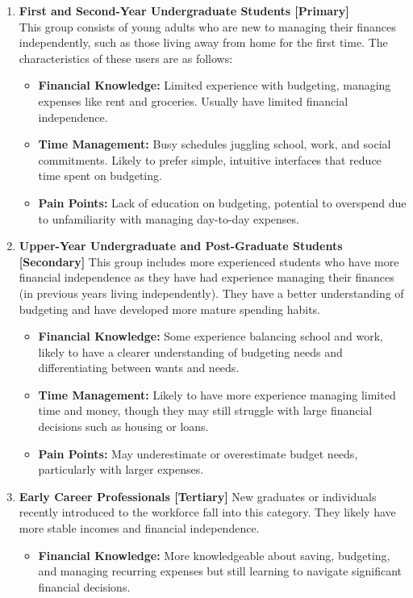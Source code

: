 \documentclass[12pt]{article}
\begin{document}
\begin{enumerate}
	\item \textbf{First and Second-Year Undergraduate Students [Primary]} \\ 
		This group consists of young adults who are new to managing their finances independently, such as those living away from home for the first time. The characteristics of these users are as follows:
		\begin{itemize}
			\item \textbf{Financial Knowledge:} Limited experience with budgeting, managing expenses like rent and groceries. Usually have limited financial independence.
			\item \textbf{Time Management:} Busy schedules juggling school, work, and social commitments. Likely to prefer simple, intuitive interfaces that reduce time spent on budgeting.
			\item \textbf{Pain Points:} Lack of education on budgeting, potential to overspend due to unfamiliarity with managing day-to-day expenses.
		\end{itemize}
	\item \textbf{Upper-Year Undergraduate and Post-Graduate Students [Secondary]}
		This group includes more experienced students who have more financial independence as they have had experience managing their finances (in previous years living independently).  They have a better understanding of budgeting and have developed more mature spending habits.
		\begin{itemize}
			\item \textbf{Financial Knowledge:}  Some experience balancing school and work, likely to have a clearer understanding of budgeting needs and differentiating between wants and needs.
			\item \textbf{Time Management:} Likely to have more experience managing limited time and money, though they may still struggle with large financial decisions such as housing or loans.
			\item \textbf{Pain Points:}  May underestimate or overestimate budget needs, particularly with larger expenses.
		\end{itemize}
	\item \textbf{Early Career Professionals [Tertiary]}
		New graduates or individuals recently introduced to the workforce fall into this category. They likely have more stable incomes and financial independence.
		\begin{itemize}
			\item \textbf{Financial Knowledge:} More knowledgeable about saving, budgeting, and managing recurring expenses but still learning to navigate significant financial decisions.

\end{itemize}
\end{enumerate}
\end{document}
